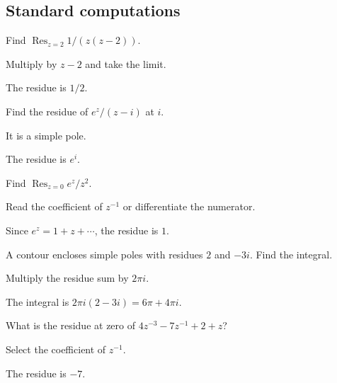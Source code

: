 \subsection*{Standard computations}

\begin{exercise}\label{exr:iv10-expand-01}
Find \(\operatorname{Res}_{z=2}1/(z(z-2))\).
\end{exercise}
\begin{hint}
Multiply by \(z-2\) and take the limit.
\end{hint}
\begin{solution}
The residue is \(1/2\).
\end{solution}

\begin{exercise}\label{exr:iv10-expand-02}
Find the residue of \(e^z/(z-i)\) at \(i\).
\end{exercise}
\begin{hint}
It is a simple pole.
\end{hint}
\begin{solution}
The residue is \(e^i\).
\end{solution}

\begin{exercise}\label{exr:iv10-expand-03}
Find \(\operatorname{Res}_{z=0}e^z/z^2\).
\end{exercise}
\begin{hint}
Read the coefficient of \(z^{-1}\) or differentiate the numerator.
\end{hint}
\begin{solution}
Since \(e^z=1+z+\cdots\), the residue is \(1\).
\end{solution}

\begin{exercise}\label{exr:iv10-expand-04}
A contour encloses simple poles with residues \(2\) and \(-3i\). Find the integral.
\end{exercise}
\begin{hint}
Multiply the residue sum by \(2\pi i\).
\end{hint}
\begin{solution}
The integral is \(2\pi i(2-3i)=6\pi+4\pi i\).
\end{solution}

\begin{exercise}\label{exr:iv10-expand-05}
What is the residue at zero of \(4z^{-3}-7z^{-1}+2+z\)?
\end{exercise}
\begin{hint}
Select the coefficient of \(z^{-1}\).
\end{hint}
\begin{solution}
The residue is \(-7\).
\end{solution}

